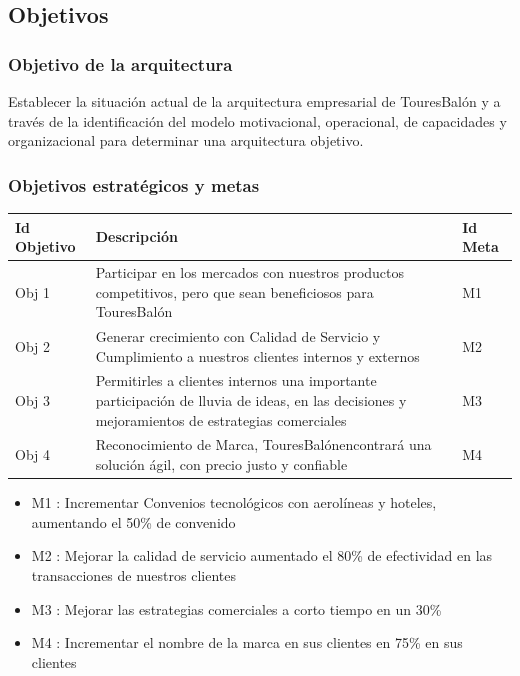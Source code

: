 \documentclass[12pt]{article}
\begin{document}

\subsection{Objetivos}


\subsubsection{Objetivo de la arquitectura}

Establecer la situación actual de la arquitectura empresarial de TouresBalón y a través de la identificación del modelo motivacional, operacional, de capacidades y organizacional para determinar una arquitectura objetivo.


\subsubsection{Objetivos estratégicos y metas}

\begin{table}[H]
\centering
\resizebox{17cm}{!} {
\begin{tabular}{|l|l|l|}
\hline
\textbf{Id Objetivo} & \textbf{Descripción} & \textbf{Id Meta} \\ \hline
Obj 1 & Participar en los mercados con nuestros productos competitivos,  pero que sean beneficiosos para TouresBalón & M1 \\ \hline
Obj 2 & Generar crecimiento con Calidad de Servicio y Cumplimiento a nuestros clientes internos y externos & M2\\ \hline
Obj 3 & Permitirles a clientes internos  una importante  participación de lluvia de ideas, en las decisiones  y  mejoramientos  de estrategias  comerciales & M3 \\ \hline
Obj 4 & Reconocimiento de Marca, TouresBalónencontrará una solución ágil, con precio justo y confiable& M4 \\ \hline
\end{tabular}
}
\end{table}


\begin{itemize}
    \item M1 : Incrementar Convenios tecnológicos con aerolíneas y hoteles, aumentando el 50\% de convenido
    \item M2 : Mejorar la calidad de servicio aumentado el 80\% de efectividad en las transacciones de nuestros clientes
    \item M3 : Mejorar las estrategias comerciales a corto tiempo en un 30\%
    \item M4 : Incrementar el nombre de la marca en sus clientes en 75\% en sus clientes
\end{itemize}
\end{document}
